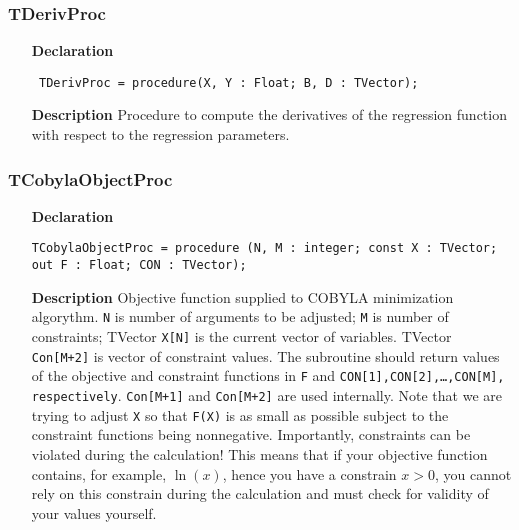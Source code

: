 \documentclass[12pt,a4paper,oneside]{report}
\newcommand{\lmatha}[1]{   %
	\marginpar{\vspace{#1} 
		\begin{flushright}
			LMath 0.5
	\end{flushright} }
}
\newcommand{\declarationitem}[1]{\textbf{#1}}
\newcommand{\descriptiontitle}[1]{\textbf{#1}}
\newcommand{\code}[1]{\texttt{#1}}
\begin{document}
\subsubsection{TDerivProc}
\label{utypes-TDerivProc}
\begin{itemize}\item[\declarationitem{Declaration}\hfill]
	\begin{flushleft}
		\code{
			TDerivProc = procedure(X, Y : Float; B, D : TVector);}
	\end{flushleft}
	\par
	\item[\descriptiontitle{Description}]
	Procedure to compute the derivatives of the regression function with respect to the regression parameters.
\end{itemize}
\subsubsection{TCobylaObjectProc}\lmatha{-28pt}
\label{utypes_TCobylaObjectProc}
\begin{itemize}
	\item[\declarationitem{Declaration}\hfill]
	\begin{flushleft}
	\code{TCobylaObjectProc = procedure (N, M : integer; const X : TVector; out F : Float; CON : TVector);}
	\end{flushleft}
	\item[\descriptiontitle{Description}]
	Objective function supplied to COBYLA minimization algorythm.
	\code{N} is number of arguments to be adjusted;
	\code{M} is number of constraints;
	TVector \code{X[N]} is the current vector of variables.
	TVector \code{Con[M+2]} is vector of constraint values. The subroutine should return values of the objective and constraint functions in \code{F} and \code{CON[1],CON[2],\dots,CON[M], respectively}. \code{Con[M+1]} and \code{Con[M+2]} are used internally. Note that we are trying to adjust \code{X} so that \code{F(X)} is as small as possible subject to the constraint functions
	being nonnegative. Importantly, constraints can be violated during the calculation!  This means that if your objective function contains, for example, $\ln(x)$, hence you have a constrain $x>0$, you cannot rely on this constrain during the calculation and must check for validity of your values yourself.
\end{itemize}
\end{document}
